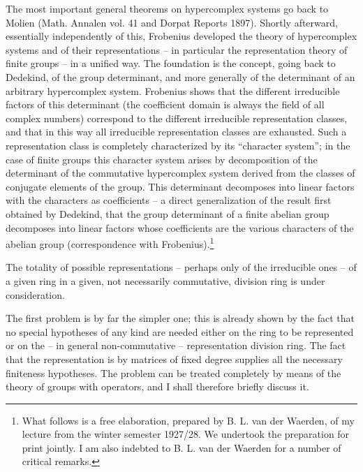 \documentclass[11pt]{article}
\begin{document}
The most important general theorems on hypercomplex systems go back to Molien (Math. Annalen vol. 41 and Dorpat Reports 1897). Shortly afterward, essentially independently of this, Frobenius developed the theory of hypercomplex systems and of their representations -- in particular the representation theory of finite groups -- in a unified way. The foundation is the concept, going back to Dedekind, of the group determinant, and more generally of the determinant of an arbitrary hypercomplex system. Frobenius shows that the different irreducible factors of this determinant (the coefficient domain is always the field of all complex numbers) correspond to the different irreducible representation classes, and that in this way all irreducible representation classes are exhausted. Such a representation class is completely characterized by its ``character system''; in the case of finite groups this character system arises by decomposition of the determinant of the commutative hypercomplex system derived from the classes of conjugate elements of the group. This determinant decomposes into linear factors with the characters as coefficients -- a direct generalization of the result first obtained by Dedekind, that the group determinant of a finite abelian group decomposes into linear factors whose coefficients are the various characters of the abelian group (correspondence with Frobenius).\footnote{What follows is a free elaboration, prepared by B. L. van der Waerden, of my lecture from the winter semester 1927/28. We undertook the preparation for print jointly. I am also indebted to B. L. van der Waerden for a number of critical remarks.}

The totality of possible representations -- perhaps only of the irreducible ones -- of a given ring in a given, not necessarily commutative, division ring is under consideration.

The first problem is by far the simpler one; this is already shown by the fact that no special hypotheses of any kind are needed either on the ring to be represented or on the -- in general non-commutative -- representation division ring. The fact that the representation is by matrices of fixed degree supplies all the necessary finiteness hypotheses. The problem can be treated completely by means of the theory of groups with operators, and I shall therefore briefly discuss it.
\end{document}
